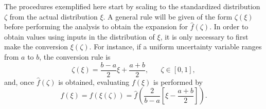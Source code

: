 The procedures exemplified here start by scaling to the standardized distribution $\zeta$ from the actual distribution $\xi$.  A general rule will be given of the form $\zeta(\xi)$ before performing the analysis to obtain the expansion for $\hat f(\zeta)$.  In order to obtain values using inputs in the distribution of $\xi$, it is only necessary to first make the conversion $\xi(\zeta)$.  For instance, if a uniform uncertainty variable ranges from $a$ to $b$, the conversion rule is
\begin{equation}
\zeta(\xi)=\frac{b-a}{2}\xi+\frac{a+b}{2},\hspace{20pt}\zeta\in[0,1],
\end{equation}
and, once $\hat f(\zeta)$ is obtained, evaluating $f(\xi)$ is performed by
\begin{equation}
f(\xi)=f(\xi(\zeta))=\hat f\left(\frac{2}{b-a}\left[\xi-\frac{a+b}{2}\right]\right).
\end{equation}

